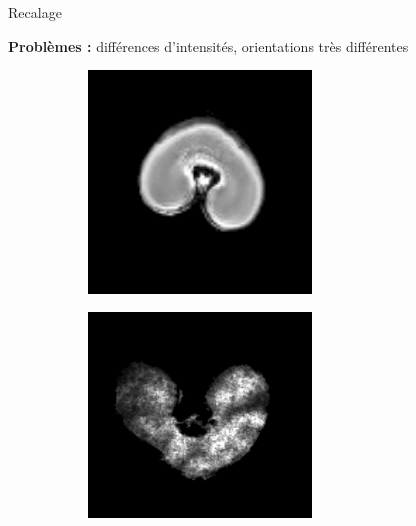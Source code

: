 \documentclass[10pt]{beamer}
\begin{document}
\begin{frame}{Recalage}

  \textbf{Problèmes :} différences d'intensités, orientations très différentes

   \begin{figure}[ht]
    \centering
    \begin{subfigure}[t]{0.5\textwidth}
      \centering
      \includegraphics[width=0.65\textwidth]{fig/mri_slice6.png}
    \end{subfigure}%
    \begin{subfigure}[t]{0.5\textwidth}
      \centering
      \includegraphics[width=0.65\textwidth]{fig/maldi_slice6}
    \end{subfigure}%

  \end{figure}

 

\end{frame}
\end{document}
